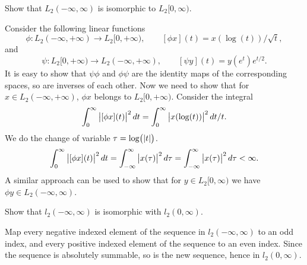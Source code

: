 \begin{problem}
	Show that $ L_2(-\infty,\infty) $ is isomorphic to $ L_2[0,\infty). $
\end{problem}
\begin{solution}
	Consider the following linear functions
	\[ \phi: L_2(-\infty,+\infty) \to L_2[0,+\infty),\qquad [\phi x](t) = x(\log(t))/\sqrt{t}, \]
	and 
	\[ \psi: L_2[0,+\infty) \to L_2(-\infty,+\infty),\qquad [\psi y](t) = y(e^{t})e^{t/2}. \]
	It is easy to show that $ \psi\phi $ and $ \phi\psi $ are the identity maps of the corresponding spaces, so are inverses of each other.
	Now we need to show that for $ x\in L_2(-\infty,+\infty) $, $ \phi x $ belongs to $ L_2[0,+\infty) $. Consider the integral
	\[ \int_{0}^{\infty}\left|[\phi x](t)\right|^2dt = \int_{0}^{\infty}\left|x(\log(t))\right|^2 dt/t. \]
	We do the change of variable $ \tau = \log(\left|t\right|) $.
	\[ \int_{0}^{\infty}\left|[\phi x](t)\right|^2dt = \int_{-\infty}^{\infty}\left|x(\tau)\right|^2 d\tau = \int_{-\infty}^{\infty} \left|x(\tau)\right|^2 d\tau < \infty. \]
	A similar approach can be used to show that for $ y\in L_2[0,\infty) $ we have $ \phi y \in L_2(-\infty,\infty) $.
\end{solution}


\begin{problem}
	Show that $ l_2(-\infty,\infty) $ is isomorphic with $ l_2(0,\infty) $.
\end{problem}
\begin{solution}
	Map every negative indexed element of the sequence in $ l_2(-\infty,\infty) $ to an odd index, and every positive indexed element of the sequence to an even index. Since the sequence is absolutely summable, so is the new sequence, hence in $ l_2(0,\infty) $.
\end{solution}


